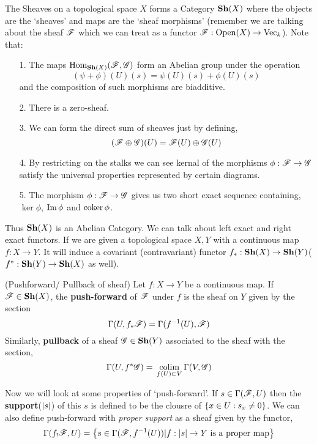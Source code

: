 \documentclass[11pt]{article}
\begin{document}
    The Sheaves on a topological space $X$ forms a Category $\mathbf{Sh}(X)$ where the objects are the `sheaves' and maps are the `sheaf morphisms' (remember we are talking about the sheaf $\mathscr{F}$ which we can treat as a functor $\mathscr{F}: \operatorname{Open}(X)\to \operatorname{Vec}_{k}$). Note that: 
    \begin{itemize}
      \item[1.] The maps $\operatorname{Hom}_{\mathbf{Sh}(X)}(\mathscr{F},\mathscr{G})$ form an Abelian group under the operation $$(\psi + \phi)(U)(s)= \psi(U)(s)+ \phi(U)(s)$$  and the composition of such morphisms are biadditive.
      \item[2.] There is a zero-sheaf. 
      \item[3.] We can form the direct sum of sheaves just by defining, $$(\mathscr{F} \oplus \mathscr{G})(U) = \mathscr{F}(U) \oplus \mathscr{G}(U)$$   
      \item[4.] By restricting on the stalks we can see kernal of the morphisms $\phi : \mathscr{F} \to \mathscr{G}$ satisfy the universal properties represented by certain diagrams. 
      \item[5.] The morphism $\phi : \mathscr{F} \to \mathscr{G}$ gives us two short exact sequence containing, $\ker \phi$, $\operatorname{Im} \phi$ and $\operatorname{coker} \phi$.
    \end{itemize}

    \noindent Thus $\mathbf{Sh}(X)$ is an Abelian Category. We can talk about left exact and right exact functors. If we are given a topological space $X,Y$ with a continuous map $f : X\to Y$. It will induce a covariant (contravariant) functor $f_{\ast}: \mathbf{Sh}(X) \to \mathbf{Sh}(Y)$($f^{\ast} : \mathbf{Sh}(Y) \to \mathbf{Sh}(X)$ as well).

    \begin{Def}{(Pushforward/ Pullback of sheaf)}{}
           Let $f: X \to Y$ be a continuous map. If $\mathscr{F} \in \mathbf{Sh}(X)$, the \textbf{push-forward} of $\mathscr{F}$ under $f$ is the sheaf on $Y$ given by the section $$\Gamma(U,f_{\ast}\mathscr{F})= \Gamma(f^{-1}(U),\mathscr{F})$$
           Similarly, \textbf{pullback} of a sheaf $\mathscr{G} \in \mathbf{Sh}(Y)$ associated to the sheaf with the section, $$\Gamma(U,f^{\ast}\mathscr{G})= \,\underset{f(U)\subset V}{\operatorname{colim}} \, \Gamma(V,\mathscr{G})$$
    \end{Def}

   \noindent Now we will look at some properties of `push-forward'. If $s \in \Gamma(\mathscr{F},U)$ then the \textbf{support}($\abs{s}$) of this $s$ is defined to be the clousre of $\qty{x \in U : s_x \neq 0}$. We can also define push-forward with \textit{proper support} as a sheaf given by the functor, $$\Gamma(f_{!}\mathscr{F},U)= \qty{s \in \Gamma(\mathscr{F}, f^{-1}(U))| f : \abs{s} \to Y \text{ is a proper map}}$$ 
\end{document}
